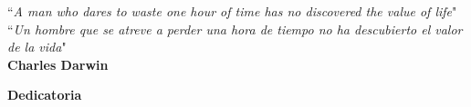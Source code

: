 \newpage{\pagestyle{empty}\cleardoublepage}


\newpage
\thispagestyle{empty} \textbf{}\normalsize
\bigskip\bigskip\bigskip

\begin{flushright}
\begin{minipage}{10cm}
    \noindent \large\vspace{14.0cm}
    

``\textit{\Large A man who dares to waste one hour of time has no discovered the value of life}" \\[0.8cm]
``\textit{\Large Un hombre que se atreve a perder una hora de tiempo no ha descubierto el valor de la vida}" \\[0.8cm]
\textbf{\LARGE Charles Darwin}

\end{minipage}
\end{flushright}

\newpage{\pagestyle{empty}\cleardoublepage}


\newpage
\thispagestyle{empty} 
\vspace*{4cm}
\textbf{\huge Dedicatoria}
\vspace*{1.0cm}

\lipsum[1-2]

\newpage{\pagestyle{empty}\cleardoublepage}



